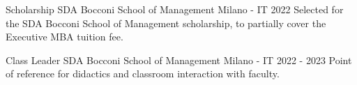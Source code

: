
\begin{cventries}
  \cventry
    {Scholarship} %
    {SDA Bocconi School of Management} %
    {}
    {Milano - IT} %
    {2022} %
    {
      Selected for the SDA Bocconi School of Management scholarship, to partially cover the Executive MBA tuition fee.
    }
    
  \cventry
  {Class Leader} %
  {SDA Bocconi School of Management} %
  {}
  {Milano - IT} %
  {2022 - 2023} %
  {
    Point of reference for didactics and classroom interaction with faculty.
  }
\end{cventries}